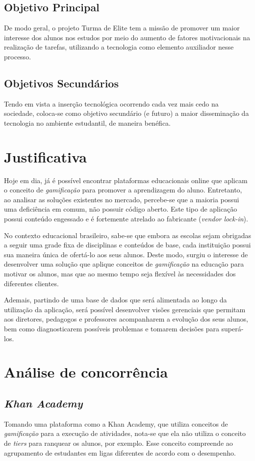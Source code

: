 \documentclass[
    12pt,               %
    openright,          %
    oneside,
    a4paper,            %
    paginasA3,  %
    MODELO,             %
    TODO,               %
    english,            %
    brazil              %
    ]{ifsp-spo-inf-ctds} %
\begin{document}
\subsection{Objetivo Principal}
De modo geral, o projeto Turma de Elite tem a missão de promover um maior interesse dos alunos nos estudos por meio do aumento de fatores motivacionais na realização de tarefas, utilizando a tecnologia como elemento auxiliador nesse processo.

\subsection{Objetivos Secundários}
Tendo em vista a inserção tecnológica ocorrendo cada vez mais cedo na sociedade, coloca-se como objetivo secundário (e futuro) a maior disseminação da tecnologia no ambiente estudantil, de maneira benéfica.

\section{Justificativa}
Hoje em dia, já é possível encontrar plataformas educacionais online que aplicam o conceito de \textit{gamificação} para promover a aprendizagem do aluno. Entretanto, ao analisar as soluções existentes no mercado, percebe-se que a maioria possui uma deficiência em comum, não possuir código aberto. Este tipo de aplicação possui conteúdo engessado e é fortemente atrelado ao fabricante (\textit{vendor lock-in}). 

No contexto educacional brasileiro, sabe-se que embora as escolas sejam obrigadas a seguir uma grade fixa de disciplinas e conteúdos de base, cada instituição possui sua maneira única de ofertá-lo aos seus alunos. Deste modo, surgiu o interesse de desenvolver uma solução que aplique conceitos de \textit{gamificação} na educação para motivar os alunos, mas que ao mesmo tempo seja flexível às necessidades dos diferentes clientes. 

Ademais, partindo de uma base de dados que será alimentada ao longo da utilização da aplicação, será possível desenvolver visões gerenciais que permitam aos diretores, pedagogos e professores acompanharem a evolução dos seus alunos, bem como diagnosticarem possíveis problemas e tomarem decisões para superá-los.

\section{Análise de concorrência}
\subsection{\textit{Khan Academy}}
Tomando uma plataforma como a Khan Academy, que utiliza conceitos de \textit{gamificação} para a execução de atividades, nota-se que ela não utiliza o conceito de \textit{tiers} para ranquear os alunos, por exemplo. Esse conceito compreende ao agrupamento de estudantes em ligas diferentes de acordo com o desempenho.
\end{document}
